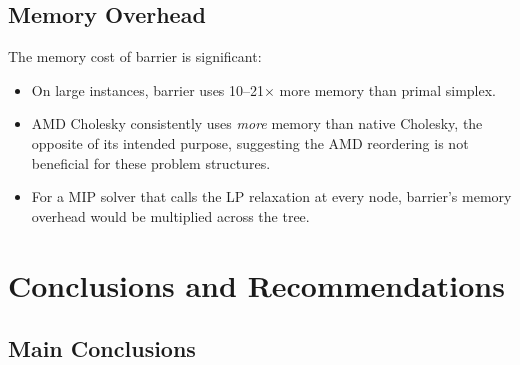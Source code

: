 \documentclass[11pt,a4paper]{article}
\begin{document}
\subsection{Memory Overhead}

The memory cost of barrier is significant:
\begin{itemize}
  \item On large instances, barrier uses 10--21$\times$ more memory than
        primal simplex.
  \item AMD Cholesky consistently uses \emph{more} memory than native
        Cholesky, the opposite of its intended purpose, suggesting the
        AMD reordering is not beneficial for these problem structures.
  \item For a MIP solver that calls the LP relaxation at every node,
        barrier's memory overhead would be multiplied across the tree.
\end{itemize}

\section{Conclusions and Recommendations}

\subsection{Main Conclusions}
\end{document}
